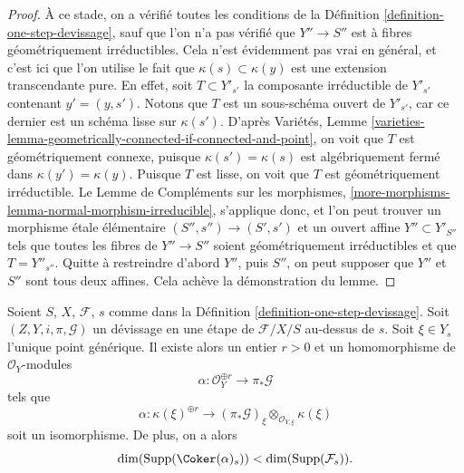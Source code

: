 \begin{proof}
\medskip\noindent
À ce stade, on a vérifié toutes les conditions de la
Définition \ref{definition-one-step-devissage},
sauf que l'on n'a pas vérifié que $Y'' \to S''$ est à fibres géométriquement
irréductibles. Cela n'est évidemment pas vrai en général,
et c'est ici que l'on utilise le fait que
$\kappa(s) \subset \kappa(y)$ est une extension transcendante pure. En effet,
soit $T \subset Y'_{s'}$ la composante irréductible de
$Y'_{s'}$ contenant $y' = (y, s')$. Notons que $T$ est un sous-schéma ouvert
de $Y'_{s'}$, car ce dernier est un schéma lisse sur $\kappa(s')$. D'après
Variétés,
Lemme \ref{varieties-lemma-geometrically-connected-if-connected-and-point},
on voit que $T$ est géométriquement connexe, puisque $\kappa(s') = \kappa(s)$
est algébriquement fermé dans $\kappa(y') = \kappa(y)$.
Puisque $T$ est lisse, on voit que $T$ est géométriquement irréductible. Le
Lemme de Compléments sur les morphismes,
\ref{more-morphisms-lemma-normal-morphism-irreducible},
s'applique donc, et l'on peut trouver un morphisme \'etale élémentaire
$(S'', s'') \to (S', s')$ et un ouvert affine $Y'' \subset Y'_{S''}$
tels que toutes les fibres de $Y'' \to S''$ soient géométriquement irréductibles
et que $T = Y''_{s''}$. Quitte à restreindre d'abord $Y''$, puis $S''$,
on peut supposer que $Y''$ et $S''$ sont tous deux affines.
Cela achève la démonstration du lemme.
\end{proof}

\begin{lemma}
\label{lemma-existence-alpha}
Soient $S$, $X$, $\mathcal{F}$, $s$ comme dans la
Définition \ref{definition-one-step-devissage}.
Soit $(Z, Y, i, \pi, \mathcal{G})$ un d\'evissage en une étape
de $\mathcal{F}/X/S$ au-dessus de $s$.
Soit $\xi \in Y_s$ l'unique point générique.
Il existe alors un entier $r > 0$ et un homomorphisme de $\mathcal{O}_Y$-modules
$$
\alpha : \mathcal{O}_Y^{\oplus r} \longrightarrow \pi_*\mathcal{G}
$$
tels que
$$
\alpha :
\kappa(\xi)^{\oplus r}
\longrightarrow
(\pi_*\mathcal{G})_\xi \otimes_{\mathcal{O}_{Y, \xi}} \kappa(\xi)
$$
soit un isomorphisme. De plus, on a alors
$$
\dim(\text{Supp}(\Coker(\alpha)_s)) < \dim(\text{Supp}(\mathcal{F}_s)).
$$
\end{lemma}

